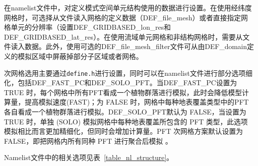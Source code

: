 \documentclass[a4paper,12pt,twoside]{article}
\begin{document}
在namelist文件中，对定义模式空间单元结构使用的数据进行设置。在使用经纬度网格时，可选择从文件读入网格的定义数据（DEF\_file\_mesh）或者直接指定网格单元的分辨率（设置DEF\_GRIDBASED\_lon\_res和DEF\_GRIDBASED\_lat\_res）。在使用流域单元网格和非结构网格时，需要从文件读入数据。此外，使用可选的DEF\_file\_mesh\_\allowbreak filter文件可从由DEF\_domain定义的模拟区域中屏蔽掉部分子区域或者网格。

次网格选用主要通过\texttt{define.h}进行设置，同时可以在namelist文件进行部分选项细化，包括DEF\_FAST\_PC和DEF\_SOLO\_PFT。当DEF\_FAST\_PC设置为 TRUE 时，每个网格中所有PFT看成一个植物群落进行模拟，此时会降低模型计算量，提高模拟速度(FAST)；为 FALSE 时，网格中每种地表覆盖类型中的PFT各自看成一个植物群落进行模拟。DEF\_SOLO\_PFT默认为 FALSE，当设置为 TRUE 时，单独 (SOLO) 模拟网格中每种地表覆盖所包含的 PFT 类型，此选项模拟相比而言更加精细化，但同时会增加计算量。PFT 次网格方案默认设置为FALSE，即把网格内所有同种 PFT 进行聚合后模拟 。

Namelist文件中的相关选项见表~\ref{table_nl_structure}。
\end{document}
